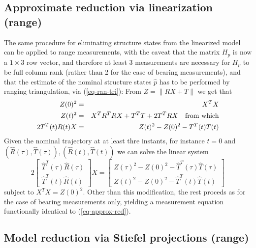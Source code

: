 \documentclass[]{article}
\newcommand{\ba}{\left[ \begin{array}}
\newcommand{\ea}{\end{array} \right]}
\begin{document}
\subsection{Approximate reduction via linearization (range)}

The same procedure for eliminating structure states from the linearized model can be applied to range measurements, with the caveat that the matrix $H_p$ is now a $1\times 3$ row vector, and therefore at least 3 measurements are necessary for $H_p$ to be full column rank (rather than 2 for the case of bearing measurements), and that the estimate of the nominal structure states $\hat p$ has to be performed by ranging triangulation, via (\ref{eq-ran-tri}): From $Z = \| R X + T \|$ we get that 
\begin{eqnarray}
Z(0)^2 & = &  X^T X \nonumber \\
Z(t)^2 &=& X^T R^T R X + T^T T + 2 T^T R X ~~~{\rm from \ which} \nonumber \\
2 T^T(t) R(t) X &=& Z(t)^2 - Z(0)^2 - T^T(t)T(t) 
\end{eqnarray}
Given the nominal trajectory at at least thre instants, for instance $t = 0$ and $(\hat R(\tau), \hat T(\tau)), (\hat R(t), \hat T(t))$ we can solve the linear system
\begin{equation}
2\ba{c}
{\hat T}^T(\tau)\hat R(\tau) \\
{\hat T}^T(t) \hat R(t)
\ea
X = \ba{c}
Z(\tau)^2 - Z(0)^2 - {\hat T}^T(\tau){\hat T}(\tau) \\
Z(t)^2 - Z(0)^2 - {\hat T}^T(t){\hat T}(t)
\ea
\end{equation}
subject to $X^T X = Z(0)^2$. Other than this modification, the rest proceds as for the case of bearing measurements only, yielding a measurement equation functionally identical to (\ref{eq-approx-red}).

\subsection{Model reduction via Stiefel projections (range)} 
\end{document}
